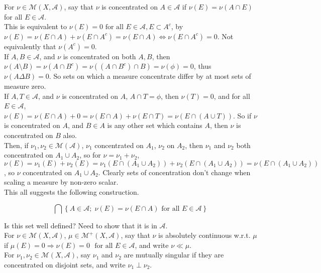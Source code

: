 \documentclass[12pt]{article}
\newcommand{\fall}[0] { \textrm{ for all } }
\newcommand{\A}[0] { \mathcal{A} }
\newcommand{\M}[0] { \mathcal{M} }
\newcommand{\rimply}[0] { \Rightarrow }
\newcommand{\lrimply}[0] { \Leftrightarrow }
\begin{document}

\break

For $\nu \in \M(X, \A)$, say that $\nu$ is concentrated on $A \in \A$ if $\nu(E) = \nu(A \cap E)$ for all $E \in \A$. \\

\noindent
This is equivalent to $\nu(E) = 0 \fall E \in \A, E \subset A^c$, by $\nu(E) = \nu(E \cap A) + \nu( E \cap A^c) = \nu(E \cap A) \lrimply \nu( E \cap A^c) = 0$.  Not equivalently that $\nu(A^c) = 0$. \\


\noindent
If $A,B \in \A$, and $\nu$ is concentrated on both $A,B$, then $\nu(A \setminus B) = \nu( A \cap B^c) = \nu( (A \cap B^c) \cap B ) = \nu( \phi ) = 0$, thus $\nu( A \Delta B) = 0$. So sets on which a measure concentrate differ by at most sets of measure zero. \\


\noindent
If $A,T \in \A$, and $\nu$ is concentrated on $A$, $A \cap T = \phi$, then $\nu(T) = 0$, and for all $E \in \A$, $\nu(E) = \nu(E \cap A) + 0 = \nu(E \cap A) + \nu(E \cap T) = \nu(E \cap (A \cup T))$. So if $\nu$ is concentrated on $A$, and $B \in A$ is any other set which contains $A$, then $\nu$ is concentrated on $B$ also. \\


\noindent
Then, if $\nu_1, \nu_2 \in \M(\A)$, $\nu_1$ concentrated on $A_1$, $\nu_2$ on $A_2$, then $\nu_1$ and $\nu_2$ both concentrated on $A_1 \cup A_2$, so for $\nu = \nu_1 + \nu_2$, $\nu(E) = \nu_1(E) + \nu_2(E) = \nu_1(E \cap (A_1 \cup A_2) ) + \nu_2(E \cap (A_1 \cup A_2) ) = \nu(E \cap (A_1 \cup A_2))$, so $\nu$ concentrated on $A_1\cup A_2$. Clearly sets of concentration don't change when scaling a measure by non-zero scalar. \\



\noindent
This all suggests the following construction.

$$
    \bigcap \left\{ A \in \A ; \; \nu(E) = \nu(E \cap A) \fall E \in \A  \right\}
$$

\noindent
Is this set well defined? Need to show that it is in $\A$. \\


For $\nu \in \M(X, \A)$, $\mu \in \M^+(X, \A)$, say that $\nu$ is absolutely continuous w.r.t. $\mu$ if $\mu(E) = 0 \rimply \nu(E) = 0$ $\fall E \in \A$, and write $\nu \ll \mu$. \\

For $\nu_1, \nu_2 \in \M(X, \A)$, say $\nu_1$ and $\nu_2$ are mutually singular if they are concentrated on disjoint sets, and write $\nu_1 \perp \nu_2$. \\
\end{document}
